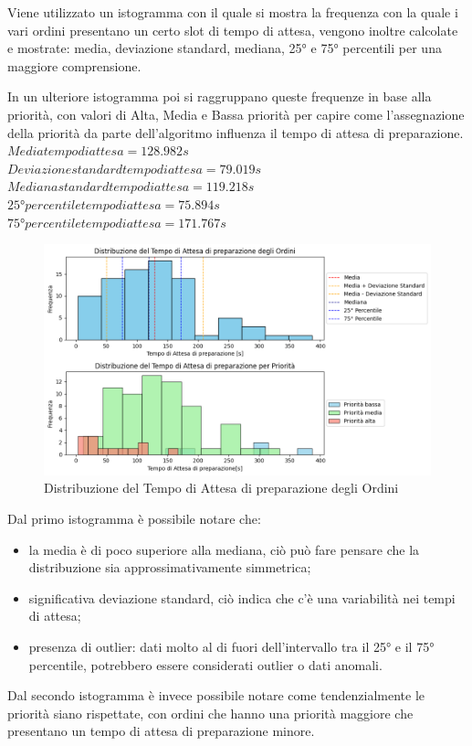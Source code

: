 Viene utilizzato un istogramma con il quale si mostra la frequenza con la quale i vari ordini presentano un certo slot di tempo di attesa, 
vengono inoltre calcolate e mostrate: media, deviazione standard, mediana, 25° e 75° percentili per una maggiore comprensione.

In un ulteriore istogramma poi si raggruppano queste frequenze in base alla priorità, con valori di Alta, Media e Bassa priorità per capire come l'assegnazione della priorità da parte dell'algoritmo influenza il tempo di attesa di preparazione.\\
$Media tempo di attesa = 128.982s$\\
$Deviazione standard tempo di attesa = 79.019s$\\
$Mediana standard tempo di attesa = 119.218s$\\
$25° percentile tempo di attesa = 75.894s$\\
$75° percentile tempo di attesa = 171.767s$
\begin{figure}[H]
	\centering
	\includegraphics[scale=0.6]{iterazione3/images/distr_t_attesa_prep.png}
	\caption{Distribuzione del Tempo di Attesa di preparazione degli Ordini\label{fig:distr_t_attesa_prep}}
\end{figure}
Dal primo istogramma è possibile notare che:
\begin{itemize}
	\item la media è di poco superiore alla mediana, ciò può fare pensare che la distribuzione sia approssimativamente simmetrica;
	\item significativa deviazione standard, ciò indica che c'è una variabilità nei tempi di attesa;
	\item presenza di outlier: dati molto al di fuori dell'intervallo tra il 25° e il 75° percentile, potrebbero essere considerati outlier o dati anomali.
\end{itemize}
Dal secondo istogramma è invece possibile notare come tendenzialmente le priorità siano rispettate, con ordini che hanno una priorità maggiore che presentano un tempo di attesa di preparazione minore.

